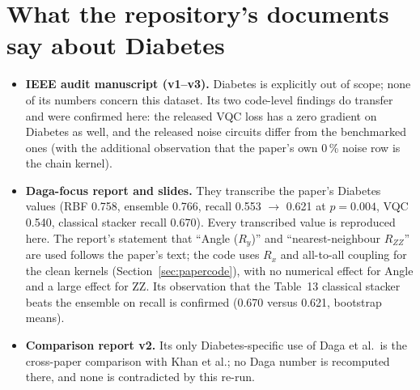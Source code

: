 \documentclass[11pt,a4paper]{article}
\begin{document}
\section{What the repository's documents say about Diabetes}
\begin{itemize}[nosep]
  \item \textbf{IEEE audit manuscript (v1--v3).} Diabetes is explicitly out of scope; none of its numbers concern this dataset. Its two code-level findings do transfer and were confirmed here: the released VQC loss has a zero gradient on Diabetes as well, and the released noise circuits differ from the benchmarked ones (with the additional observation that the paper's own 0\,\% noise row is the chain kernel).
  \item \textbf{Daga-focus report and slides.} They transcribe the paper's Diabetes values (RBF 0.758, ensemble 0.766, recall 0.553 $\to$ 0.621 at $p=0.004$, VQC 0.540, classical stacker recall 0.670). Every transcribed value is reproduced here. The report's statement that ``Angle ($R_y$)'' and ``nearest-neighbour $R_{ZZ}$'' are used follows the paper's text; the code uses $R_x$ and all-to-all coupling for the clean kernels (Section~\ref{sec:papercode}), with no numerical effect for Angle and a large effect for ZZ. Its observation that the Table~13 classical stacker beats the ensemble on recall is confirmed (0.670 versus 0.621, bootstrap means).
  \item \textbf{Comparison report v2.} Its only Diabetes-specific use of Daga et al.\ is the cross-paper comparison with Khan et al.; no Daga number is recomputed there, and none is contradicted by this re-run.
\end{itemize}

\end{document}
